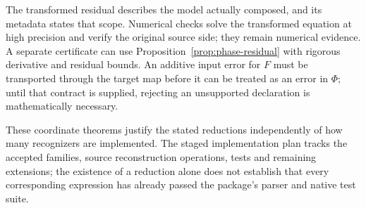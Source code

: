 The transformed residual describes the model actually composed, and its metadata states that scope. Numerical checks solve the transformed equation at high precision and verify the original source side; they remain numerical evidence. A separate certificate can use Proposition~\ref{prop:phase-residual} with rigorous derivative and residual bounds. An additive input error for $F$ must be transported through the target map before it can be treated as an error in $\Phi$; until that contract is supplied, rejecting an unsupported declaration is mathematically necessary.

These coordinate theorems justify the stated reductions independently of how many recognizers are implemented. The staged implementation plan tracks the accepted families, source reconstruction operations, tests and remaining extensions; the existence of a reduction alone does not establish that every corresponding expression has already passed the package's parser and native test suite.

